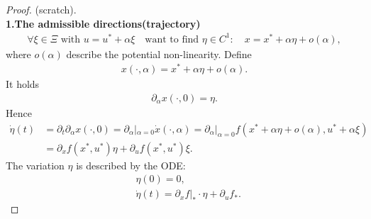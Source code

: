 \documentclass[a4paper,11pt,fleqn]{book}
\theoremstyle{definition}
\theoremstyle{remark}
\begin{document}
\begin{proof}(scratch).
\quad\\
\textbf{1.The admissible directions(trajectory)}
\begin{align*}
	\forall \xi \in \Xi \text{ with } u = u^* + \alpha \xi \quad \text{want to find } \eta \in C^1:  \quad x = x^* + \alpha \eta + o(\alpha),
\end{align*}
where $o(\alpha)$ describe the potential non-linearity. Define
\begin{align*}
	x(\cdot, \alpha) = x^* + \alpha \eta + o(\alpha).
\end{align*}
It holds
\begin{align*}
	\partial_\alpha x(\cdot, 0) = \eta . 
\end{align*}
Hence
\begin{align*}
	\dot{\eta}(t) &= \partial_t \partial_\alpha x(\cdot, 0) = \partial_\alpha|_{\alpha = 0} \dot{x}(\cdot, \alpha) = \partial_\alpha|_{\alpha = 0}f(x^* + \alpha \eta + o(\alpha), u^* + \alpha \xi)\\
	& = \partial_x f(x^*, u^*) \eta + \partial_uf(x^*, u^*)\xi.
\end{align*}
The variation $\eta$ is described by the ODE:
\begin{equation}
\begin{aligned}
	& \eta(0) = 0, \\
	& \dot{\eta}(t) = \partial_xf|_* \cdot \eta + \partial_u f_*. 
\end{aligned}
\end{equation}


\end{proof}
\end{document}
